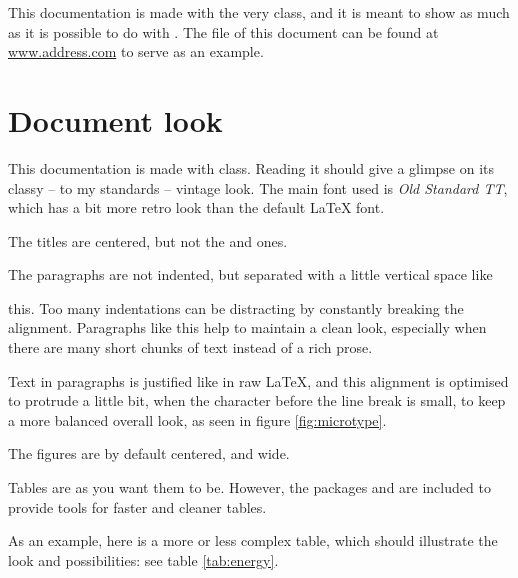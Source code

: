 \documentclass[a4paper, 11pt]{old-dms}
\begin{document}
This documentation is made with the very  class, and it is meant to show as much as it is possible to do with . The  file of this document can be found at \url{www.address.com} to serve as an example.


\section{Document look}

This documentation is made with  class. Reading it should give a glimpse on its classy -- to my standards -- vintage look. The main font used is \textit{Old Standard TT}, which has a bit more retro look than the default \LaTeX{} font.

The  titles are centered, but not the  and  ones.

The paragraphs are not indented, but separated with a little vertical space like

this. Too many indentations can be distracting by constantly breaking the alignment. Paragraphs like this help to maintain a clean look, especially when there are many short chunks of text instead of a rich prose.

Text in paragraphs is justified like in raw \LaTeX{}, and this alignment is optimised to protrude a little bit, when the character before the line break is small, to keep a more balanced overall look, as seen in figure \ref{fig:microtype}.


The figures are by default centered, and  wide.

Tables are as you want them to be. However, the packages  and  are included to provide tools for faster and cleaner tables.

As an example, here is a more or less complex table, which should illustrate the look and possibilities: see table \ref{tab:energy}.
\end{document}
